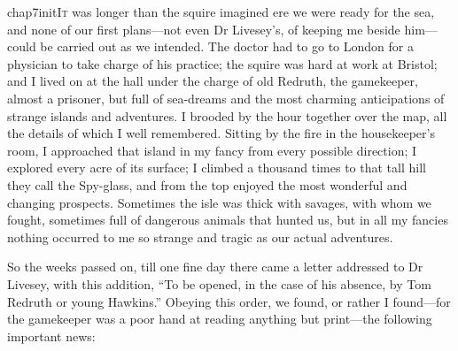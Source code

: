 
   \lettrine[lines=4,image=true]{chap7initI}{t} was longer than the squire imagined ere we were ready for the sea, and none of our first plans---not even Dr Livesey’s, of keeping me beside him---could be carried out as we intended. The doctor had to go to London for a physician to take charge of his practice; the squire was hard at work at Bristol; and I lived on at the hall under the charge of old Redruth, the gamekeeper, almost a prisoner, but full of sea-dreams and the most charming anticipations of strange islands and adventures. I brooded by the hour together over the map, all the details of which I well remembered. Sitting by the fire in the housekeeper’s room, I approached that island in my fancy from every possible direction; I explored every acre of its surface; I climbed a thousand times to that tall hill they call the Spy-glass, and from the top enjoyed the most wonderful and changing prospects. Sometimes the isle was thick with savages, with whom we fought, sometimes full of dangerous animals that hunted us, but in all my fancies nothing occurred to me so strange and tragic as our actual adventures.

So the weeks passed on, till one fine day there came a letter addressed to Dr Livesey, with this addition, \enquote{To be opened, in the case of his absence, by Tom Redruth or young Hawkins.} Obeying this order, we found, or rather I found---for the gamekeeper was a poor hand at reading anything but print---the following important news:

